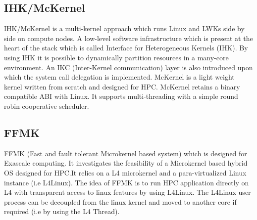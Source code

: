 \subsection{IHK/McKernel}
IHK/McKernel is a multi-kernel approach 
which runs Linux and LWKs side by side on 
compute nodes. A low-level software infrastructure
which is present at the heart of the stack 
which is called Interface for Heterogeneous
Kernels (IHK). By using IHK it is 
possible to dynamically partition resources 
in a many-core environment. An IKC (Inter-Kernel 
communication) layer is also introduced upon which 
the system call delegation is implemented. 
McKernel is a light weight kernel written 
from scratch and designed for HPC. McKernel
retains a binary compatible ABI with Linux. 
It supports multi-threading with a simple 
round robin cooperative scheduler. 


\subsection{FFMK}
FFMK (Fast and fault tolerant Microkernel based system) which 
is designed for Exascale computing. It investigates 
the feasibility of a Microkernel based hybrid OS designed 
for HPC.It relies on a L4 microkernel and a para-virtualized
Linux instance (i.e L4Linux\cite{l4linux}).
The idea of FFMK is to run HPC application directly on 
L4 with transparent access to linux features by using 
L4Linux. The L4Linux user process can be decoupled 
from the linux kernel and moved to another core 
if required (i.e by using the L4 Thread).









